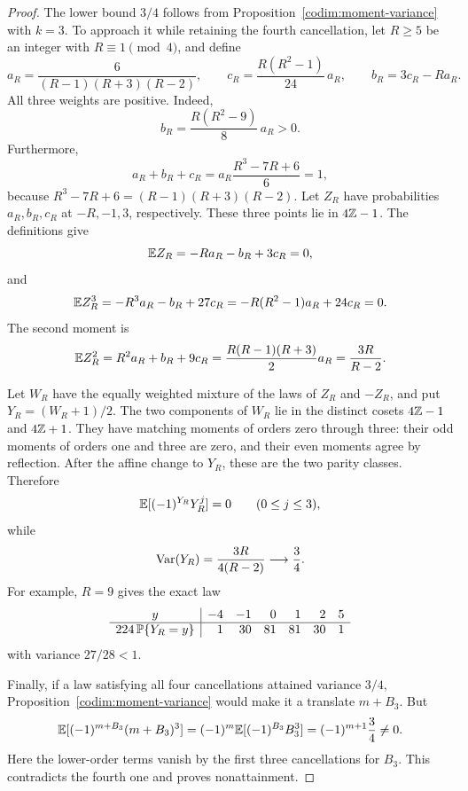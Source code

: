 \begin{proof}
The lower bound \(3/4\) follows from
Proposition~\ref{codim:moment-variance} with \(k=3\).
To approach it while retaining the fourth cancellation, let
\(R\ge5\) be an integer with \(R\equiv1\pmod4\), and define
\[
a_R=\frac{6}{(R-1)(R+3)(R-2)},\qquad
c_R=\frac{R(R^2-1)}{24}\,a_R,\qquad
b_R=3c_R-Ra_R.
\]
All three weights are positive.  Indeed,
\[
b_R=\frac{R(R^2-9)}8\,a_R>0.
\]
Furthermore,
\[
a_R+b_R+c_R
=a_R\frac{R^3-7R+6}{6}=1,
\]
because \(R^3-7R+6=(R-1)(R+3)(R-2)\).
Let \(Z_R\) have probabilities \(a_R,b_R,c_R\) at
\(-R,-1,3\), respectively.  These three points lie in \(4\mathbb Z-1\).
The definitions give
\[
\mathbb E Z_R=-Ra_R-b_R+3c_R=0,
\]
and
\[
\mathbb E Z_R^3
=-R^3a_R-b_R+27c_R
=-R(R^2-1)a_R+24c_R=0.
\]
The second moment is
\[
\mathbb E Z_R^2
=R^2a_R+b_R+9c_R
=\frac{R(R-1)(R+3)}2a_R
=\frac{3R}{R-2}.
\]

Let \(W_R\) have the equally weighted mixture of the laws of
\(Z_R\) and \(-Z_R\), and put \(Y_R=(W_R+1)/2\).
The two components of \(W_R\) lie in the distinct cosets
\(4\mathbb Z-1\) and \(4\mathbb Z+1\).  They have matching moments of orders
zero through three: their odd moments of orders one and three are
zero, and their even moments agree by reflection.
After the affine change to \(Y_R\), these are the two parity classes.
Therefore
\[
\mathbb E[(-1)^{Y_R}Y_R^j]=0\qquad(0\le j\le3),
\]
while
\[
\operatorname{Var}(Y_R)=\frac{3R}{4(R-2)}\longrightarrow\frac34.
\]
For example, \(R=9\) gives the exact law
\[
\begin{array}{c|rrrrrr}
y&-4&-1&0&1&2&5\\ \hline
224\,\mathbb P\{Y_R=y\}&1&30&81&81&30&1
\end{array}
\]
with variance \(27/28<1\).

Finally, if a law satisfying all four cancellations attained variance
\(3/4\), Proposition~\ref{codim:moment-variance} would make it
a translate \(m+B_3\).  But
\[
\mathbb E[(-1)^{m+B_3}(m+B_3)^3]
=(-1)^m\mathbb E[(-1)^{B_3}B_3^3]
=(-1)^{m+1}\frac34\ne0.
\]
Here the lower-order terms vanish by the first three cancellations
for \(B_3\).  This contradicts the fourth one and proves
nonattainment.
\end{proof}

